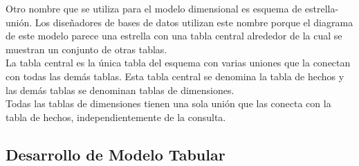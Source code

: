 \documentclass[preprint,12pt]{elsarticle}
\begin{document}
Otro nombre que se utiliza para el modelo dimensional es esquema de estrella-unión. Los diseñadores de bases de datos utilizan este nombre porque el diagrama de este modelo parece una estrella con una tabla central alrededor de la cual se muestran un conjunto de otras tablas.\\

La tabla central es la única tabla del esquema con varias uniones que la conectan con todas las demás tablas. Esta tabla central se denomina la tabla de hechos y las demás tablas se denominan tablas de dimensiones.\\

Todas las tablas de dimensiones tienen una sola unión que las conecta con la tabla de hechos, independientemente de la consulta.\\


\subsection{Desarrollo de Modelo Tabular}
\end{document}
